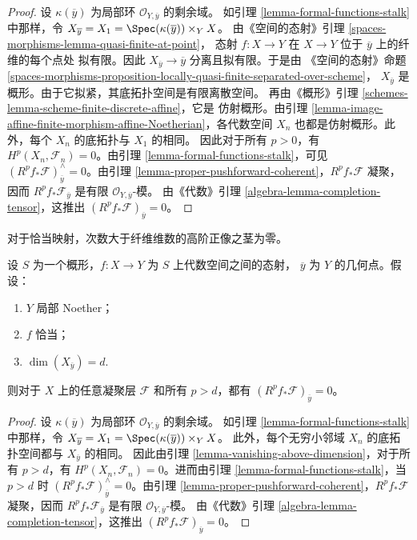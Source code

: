 \begin{proof}
设 $\kappa(\overline{y})$ 为局部环 $\mathcal{O}_{Y, \overline{y}}$ 的剩余域。
如引理 \ref{lemma-formal-functions-stalk} 中那样，令
$X_{\overline{y}} = X_1 = \Spec(\kappa(\overline{y})) \times_Y X$。
由《空间的态射》引理 \ref{spaces-morphisms-lemma-quasi-finite-at-point}，
态射 $f : X \to Y$ 在 $X \to Y$ 位于 $\overline{y}$ 上的纤维的每个点处
拟有限。因此 $X_{\overline{y}} \to \overline{y}$ 分离且拟有限。于是由
《空间的态射》命题
\ref{spaces-morphisms-proposition-locally-quasi-finite-separated-over-scheme}，
$X_{\overline{y}}$ 是概形。由于它拟紧，其底拓扑空间是有限离散空间。
再由《概形》引理 \ref{schemes-lemma-scheme-finite-discrete-affine}，它是
仿射概形。由引理
\ref{lemma-image-affine-finite-morphism-affine-Noetherian}，各代数空间
$X_n$ 也都是仿射概形。此外，每个 $X_n$ 的底拓扑与 $X_1$ 的相同。
因此对于所有 $p > 0$，有 $H^p(X_n, \mathcal{F}_n) = 0$。由引理
\ref{lemma-formal-functions-stalk}，可见
$(R^pf_*\mathcal{F})_{\overline{y}}^\wedge = 0$。由引理
\ref{lemma-proper-pushforward-coherent}，$R^pf_*\mathcal{F}$ 凝聚，因而
$R^pf_*\mathcal{F}_{\overline{y}}$ 是有限
$\mathcal{O}_{Y, \overline{y}}$-模。%
由《代数》引理 \ref{algebra-lemma-completion-tensor}，这推出
$(R^pf_*\mathcal{F})_{\overline{y}} = 0$。
\end{proof}

\begin{lemma}
\label{lemma-higher-direct-images-zero-above-dimension-fibre}
\begin{slogan}
对于恰当映射，次数大于纤维维数的高阶正像之茎为零。
\end{slogan}
设 $S$ 为一个概形，$f : X \to Y$ 为 $S$ 上代数空间之间的态射，
$\overline{y}$ 为 $Y$ 的几何点。假设：
\begin{enumerate}
\item $Y$ 局部 Noether；
\item $f$ 恰当；
\item $\dim(X_{\overline{y}}) = d$.
\end{enumerate}
则对于 $X$ 上的任意凝聚层 $\mathcal{F}$ 和所有 $p > d$，都有
$(R^pf_*\mathcal{F})_{\overline{y}} = 0$。
\end{lemma}

\begin{proof}
设 $\kappa(\overline{y})$ 为局部环 $\mathcal{O}_{Y, \overline{y}}$ 的剩余域。
如引理 \ref{lemma-formal-functions-stalk} 中那样，令
$X_{\overline{y}} = X_1 = \Spec(\kappa(\overline{y})) \times_Y X$。
此外，每个无穷小邻域 $X_n$ 的底拓扑空间都与 $X_{\overline{y}}$ 的相同。
因此由引理 \ref{lemma-vanishing-above-dimension}，对于所有 $p > d$，有
$H^p(X_n, \mathcal{F}_n) = 0$。进而由引理
\ref{lemma-formal-functions-stalk}，当 $p > d$ 时
$(R^pf_*\mathcal{F})_{\overline{y}}^\wedge = 0$。由引理
\ref{lemma-proper-pushforward-coherent}，$R^pf_*\mathcal{F}$ 凝聚，因而
$R^pf_*\mathcal{F}_{\overline{y}}$ 是有限
$\mathcal{O}_{Y, \overline{y}}$-模。%
由《代数》引理 \ref{algebra-lemma-completion-tensor}，这推出
$(R^pf_*\mathcal{F})_{\overline{y}} = 0$。
\end{proof}






